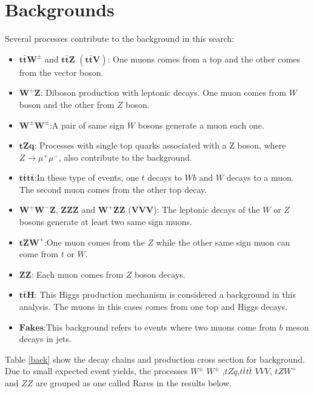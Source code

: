 \section{Backgrounds}
Several processes contribute to the background in this search:
\begin{itemize}
		\item $\bm{t\bar{t}W^{\pm}}$ and $\bm{t\bar{t}Z}$ $\bm{(t\bar{t}V)}$: One muons comes from a top and the other comes from the vector boson.
			\item $\bm{W^{+}Z}$: Diboson production with leptonic decays. One muon comes from $W$ boson and the other from $Z$ boson.
		\item $\bm{W^{\pm}W^{\pm}}$:A pair of same sign $W$ bosons generate a muon each one.
		\item $\bm{tZq}$: Processes with single top quarks associated  with a Z boson, where $Z\rightarrow \mu^+ \mu^-$, also contribute to the background.
	\item $\bm{t\bar{t}t\bar{t}}$:In these type of events, one $t$ decays to $Wb$ and $W$ decays to a muon. The second muon comes from the other top decay.
		\item$\bm{W^{+}W^{-}Z}$, $\bm{ZZZ}$ and $\bm{W^{+}ZZ}$ ($\bm{VVV}$): The leptonic decays of the $W$ or $Z$ bosons generate at least two same sign muons.
	\item $\bm{tZW^{+}}$:One muon comes from the $Z$ while the other same sign muon can come from $t$ or $W$. 
	\item $\bm{ZZ}$: Each muon comes from $Z$ boson decays.
			\item $\bm{t\bar{t}H}$: This Higgs  production mechanism is considered a background in this analysis. The muons in this cases comes from one top and Higgs decays. 
	\item $\bm{Fakes}$:This background refers to events where two muons come from  $b$ meson decays in jets.
\end{itemize}
Table \ref{back} show the decay chains and production cross section for background. Due to small expected event yields, the processes $W^\pm$ $W^\pm$ ,$tZq$,$t\bar{t}t\bar{t}$ $VVV$, $tZW^+$ and $ZZ$   are grouped as one called Rares in the results below.

\pagebreak 

